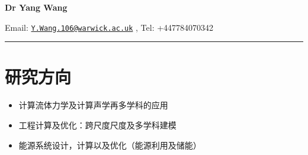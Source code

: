 \documentclass[letterpaper]{article}
\def\name{Dr Yang Wang}
\begin{document}

\centerline{\LARGE \bf \name}


\begin{minipage}{\linewidth}
\begin{center}
Email: \href{mailto:Y.Wang.106@warwick.ac.uk}{\tt Y.Wang.106@warwick.ac.uk} , Tel: +447784070342 \\
\end{center}
\end{minipage}

\vspace{0pt}
\rule{\textwidth}{1pt}

\vspace{-12pt}
\section*{研究方向}
\vspace{-10pt}
\begin{itemize}
\item 计算流体力学及计算声学再多学科的应用
\item 工程计算及优化：跨尺度尺度及多学科建模
 \item 能源系统设计，计算以及优化（能源利用及储能）


\end{itemize}
\end{document}
